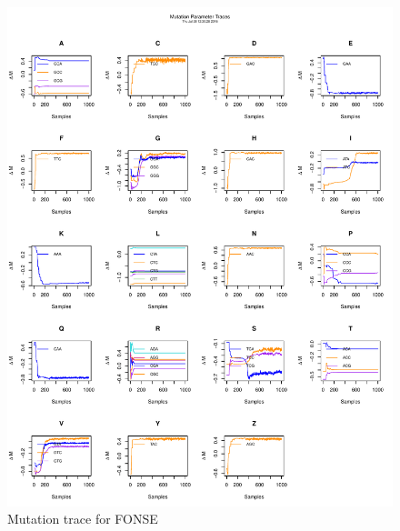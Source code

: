 \documentclass[11pt]{labbook}
\begin{document}
    \begin{figure}
        \centering
        \includegraphics[scale=.65]{FONSE_Plots/2016/July_28/MutationTrace}
        \caption{Mutation trace for FONSE}
        \label{fig:JULY28_MUT}
    \end{figure}
\end{document}
